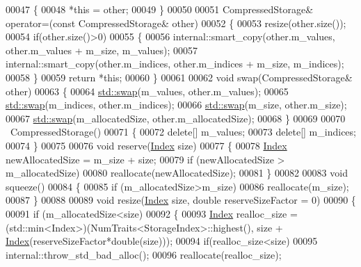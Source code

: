 \begin{DoxyCode}
00047     \{
00048       *\textcolor{keyword}{this} = other;
00049     \}
00050 
00051     CompressedStorage& operator=(\textcolor{keyword}{const} CompressedStorage& other)
00052     \{
00053       resize(other.size());
00054       \textcolor{keywordflow}{if}(other.size()>0)
00055       \{
00056         internal::smart\_copy(other.m\_values,  other.m\_values  + m\_size, m\_values);
00057         internal::smart\_copy(other.m\_indices, other.m\_indices + m\_size, m\_indices);
00058       \}
00059       \textcolor{keywordflow}{return} *\textcolor{keyword}{this};
00060     \}
00061 
00062     \textcolor{keywordtype}{void} swap(CompressedStorage& other)
00063     \{
00064       \hyperlink{endian_8c_a3ca5ecd34b04d6a243c054ac3a57f68d}{std::swap}(m\_values, other.m\_values);
00065       \hyperlink{endian_8c_a3ca5ecd34b04d6a243c054ac3a57f68d}{std::swap}(m\_indices, other.m\_indices);
00066       \hyperlink{endian_8c_a3ca5ecd34b04d6a243c054ac3a57f68d}{std::swap}(m\_size, other.m\_size);
00067       \hyperlink{endian_8c_a3ca5ecd34b04d6a243c054ac3a57f68d}{std::swap}(m\_allocatedSize, other.m\_allocatedSize);
00068     \}
00069 
00070     ~CompressedStorage()
00071     \{
00072       \textcolor{keyword}{delete}[] m\_values;
00073       \textcolor{keyword}{delete}[] m\_indices;
00074     \}
00075 
00076     \textcolor{keywordtype}{void} reserve(\hyperlink{namespace_eigen_a62e77e0933482dafde8fe197d9a2cfde}{Index} size)
00077     \{
00078       \hyperlink{namespace_eigen_a62e77e0933482dafde8fe197d9a2cfde}{Index} newAllocatedSize = m\_size + size;
00079       \textcolor{keywordflow}{if} (newAllocatedSize > m\_allocatedSize)
00080         reallocate(newAllocatedSize);
00081     \}
00082 
00083     \textcolor{keywordtype}{void} squeeze()
00084     \{
00085       \textcolor{keywordflow}{if} (m\_allocatedSize>m\_size)
00086         reallocate(m\_size);
00087     \}
00088 
00089     \textcolor{keywordtype}{void} resize(\hyperlink{namespace_eigen_a62e77e0933482dafde8fe197d9a2cfde}{Index} size, \textcolor{keywordtype}{double} reserveSizeFactor = 0)
00090     \{
00091       \textcolor{keywordflow}{if} (m\_allocatedSize<size)
00092       \{
00093         \hyperlink{namespace_eigen_a62e77e0933482dafde8fe197d9a2cfde}{Index} realloc\_size = (std::min<Index>)(NumTraits<StorageIndex>::highest(),  size + 
      \hyperlink{namespace_eigen_a62e77e0933482dafde8fe197d9a2cfde}{Index}(reserveSizeFactor*\textcolor{keywordtype}{double}(size)));
00094         \textcolor{keywordflow}{if}(realloc\_size<size)
00095           internal::throw\_std\_bad\_alloc();
00096         reallocate(realloc\_size);

\end{DoxyCode}
